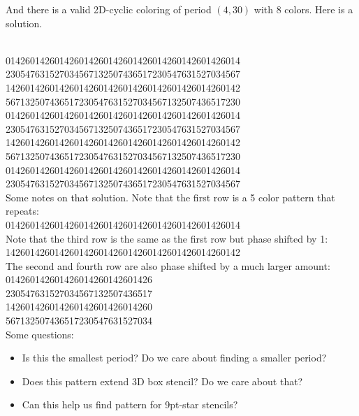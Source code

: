 \documentclass{article}
\newcommand{\highlightsol}[1]{{\color{blue}#1}}
\begin{document}
And there is a valid 2D-cyclic coloring of period $(4,30)$ with 8
colors. Here is a solution.

~\\
\highlightsol{014260142601426014260142601426}014260142601426014\\
\highlightsol{230547631527034567132507436517}230547631527034567\\
\highlightsol{142601426014260142601426014260}142601426014260142\\
\highlightsol{567132507436517230547631527034}567132507436517230\\
014260142601426014260142601426014260142601426014\\
230547631527034567132507436517230547631527034567\\
142601426014260142601426014260142601426014260142\\
567132507436517230547631527034567132507436517230\\
014260142601426014260142601426014260142601426014\\
230547631527034567132507436517230547631527034567\\

Some notes on that solution. Note that the first row is a 5 color pattern that repeats:\\
\highlightsol{01426}0142601426014260142601426014260142601426014\\

Note that the third row is the same as the first row but phase shifted by 1:\\
1426\highlightsol{01426}014260142601426014260142601426014260142\\

The second and fourth row are also phase shifted by a much larger amount:\\
014260142601426014260142601426\\
\highlightsol{230547631527034}567132507436517\\
142601426014260142601426014260\\
567132507436517\highlightsol{230547631527034}\\

Some questions:
\begin{itemize}
\item Is this the smallest period? Do we care about finding a smaller period?
\item Does this pattern extend 3D box stencil? Do we care about that?
\item Can this help us find pattern for 9pt-star stencils?
\end{itemize}
\end{document}
